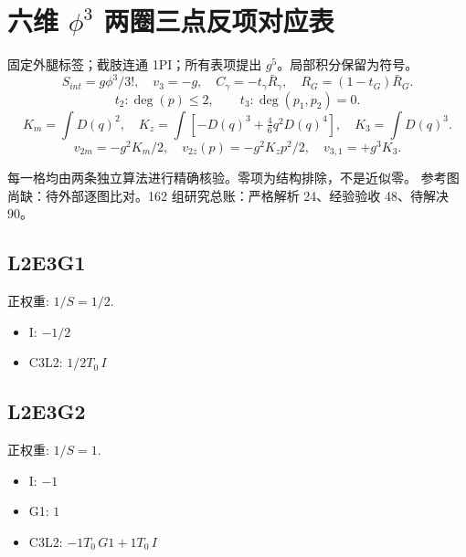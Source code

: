 \documentclass[UTF8]{ctexart}
\begin{document}
\section*{六维 $\phi^3$ 两圈三点反项对应表}
固定外腿标签；截肢连通 1PI；所有表项提出 $g^5$。局部积分保留为符号。
\[S_{int}=g\phi^3/3!,\quad v_3=-g,\quad C_\gamma=-t_\gamma\bar R_\gamma,\quad R_G=(1-t_G)\bar R_G.\]
\[t_2: \deg(p)\le2,\qquad t_3: \deg(p_1,p_2)=0.\]
\[K_m=\int D(q)^2,\quad K_z=\int[-D(q)^3+\tfrac46q^2D(q)^4],\quad K_3=\int D(q)^3.\]
\[v_{2m}=-g^2K_m/2,\quad v_{2z}(p)=-g^2K_zp^2/2,\quad v_{3,1}=+g^3K_3.\]
\begin{center}\end{center}
每一格均由两条独立算法进行精确核验。零项为结构排除，不是近似零。
参考图尚缺：待外部逐图比对。162 组研究总账：严格解析 24、经验验收 48、待解决 90。
\subsection*{L2E3G1}

正权重: $1/S=1/2$.
\begin{itemize}
\item I: $- 1/2$
\item C3L2: $1/2 T_0\,I$
\end{itemize}
\subsection*{L2E3G2}

正权重: $1/S=1$.
\begin{itemize}
\item I: $- 1$
\item G1: $1$
\item C3L2: $- 1 T_0\,G1 + 1 T_0\,I$
\end{itemize}
\end{document}
